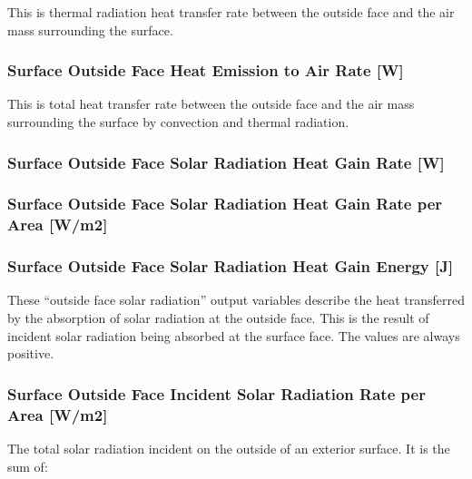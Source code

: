 This is thermal radiation heat transfer rate between the outside face and the air mass surrounding the surface.

\subsubsection{Surface Outside Face Heat Emission to Air Rate {[}W{]}}\label{surface-outside-face-heat-emission-to-air-heat-transfer-rate-w}

This is total heat transfer rate between the outside face and the air mass surrounding the surface by convection and thermal radiation.

\subsubsection{Surface Outside Face Solar Radiation Heat Gain Rate {[}W{]}}\label{surface-outside-face-solar-radiation-heat-gain-rate-w}

\subsubsection{Surface Outside Face Solar Radiation Heat Gain Rate per Area {[}W/m2{]}}\label{surface-outside-face-solar-radiation-heat-gain-rate-per-area-wm2}

\subsubsection{Surface Outside Face Solar Radiation Heat Gain Energy {[}J{]}}\label{surface-outside-face-solar-radiation-heat-gain-energy-j}

These ``outside face solar radiation'' output variables describe the heat transferred by the absorption of solar radiation at the outside face. This is the result of incident solar radiation being absorbed at the surface face. The values are always positive.

\subsubsection{Surface Outside Face Incident Solar Radiation Rate per Area {[}W/m2{]}}\label{surface-outside-face-incident-solar-radiation-rate-per-area-wm2}

The total solar radiation incident on the outside of an exterior surface. It is the sum of:

